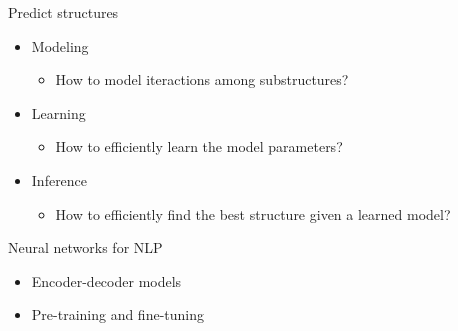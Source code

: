 \documentclass[usenames,dvipsnames,notes]{beamer}
\begin{document}
\begin{frame}
    {Predict structures}
    \begin{itemize}
        \itemsep4em
        \item Modeling
            \begin{itemize}
                \item[] How to model iteractions among substructures?
            \end{itemize}
        \item Learning 
            \begin{itemize}
                \item[] How to efficiently learn the model parameters?
            \end{itemize}
        \item Inference 
            \begin{itemize}
                \item[] How to efficiently find the best structure given a learned model? 
            \end{itemize}
    \end{itemize}
\end{frame}

\begin{frame}
    {Neural networks for NLP}
    \begin{itemize}
        \itemsep6em
        \item Encoder-decoder models
        \item Pre-training and fine-tuning
    \end{itemize}
\end{frame}
\end{document}
